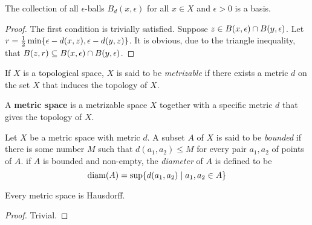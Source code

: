 \begin{proposition}
    The collection of all $\epsilon$-balls $B_d(x,\epsilon)$ for all $x\in X$ and $\epsilon > 0$ is a basis.
\end{proposition}
\begin{proof}
    The first condition is trivially satisfied. Suppose $z\in B(x,\epsilon)\cap B(y,\epsilon)$. Let $r = \frac{1}{2}\min\{\epsilon - d(x,z), \epsilon - d(y,z)\}$. It is obvious, due to the triangle inequality, that $B(z,r)\subseteq B(x,\epsilon)\cap B(y,\epsilon)$.
\end{proof}

\begin{definition}[Metrizable]
    If $X$ is a topological space, $X$ is said to be \textit{metrizable} if there exists a metric $d$ on the set $X$ that induces the topology of $X$.
\end{definition}

A \textbf{metric space} is a metrizable space $X$ together with a specific metric $d$ that gives the topology of $X$.

\begin{definition}
    Let $X$ be a metric space with metric $d$. A subset $A$ of $X$ is said to be \textit{bounded} if there is some number $M$ such that $d(a_1,a_2)\le M$ for every pair $a_1,a_2$ of points of $A$. if $A$ is bounded and non-empty, the \textit{diameter} of $A$ is defined to be 
    \begin{equation*}
        \operatorname{diam}(A) = \sup\{d(a_1,a_2)\mid a_1,a_2\in A\}
    \end{equation*}
\end{definition}

\begin{proposition}
    Every metric space is Hausdorff.
\end{proposition}
\begin{proof}
    Trivial.
\end{proof}

